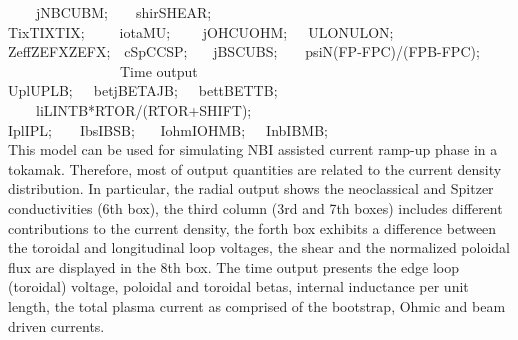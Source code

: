 {			~~~~jNB\bs CUBM;~~~~shir\bs SHEAR;
\\ \hspace*{1mm}
Tix\bs TIX\bs\bs TIX;~~~~~iota\bs MU;
			~~~~jOH\bs CUOHM;~~~ULON\bs ULON;
\\ \hspace*{1mm}
Zeff\bs ZEFX\bs\bs ZEFX;~~cSp\bs CCSP;
		~~~jBS\bs CUBS;~~~~psiN\bs (FP-FPC)/(FPB-FPC);
\smallskip\\ \hspace*{1mm}
~~~~~~~~~~~~~~~~Time output
\smallskip\\ \hspace*{1mm}
Upl\us UPLB;~~~betj\us BETAJB;~~~bett\us BETTB;
		~~~~li\us LINTB*RTOR/(RTOR+SHIFT);
\\ \hspace*{1mm}
Ipl\us IPL;~~~~Ibs\us IBSB;
		~~~Iohm\us IOHMB;~~~Inb\us IBMB\us 2;
\medskip\\}
This model can be used for simulating NBI assisted current ramp-up phase
in a tokamak.
Therefore, most of output quantities are related to the current density
distribution. 
In particular, the radial output shows the neoclassical and Spitzer
conductivities (6th box), the third column (3rd and 7th boxes) includes
different contributions to the current density, the forth box exhibits a 
difference between the toroidal and longitudinal loop voltages, the
shear and the normalized poloidal flux are displayed in the 8th box.
The time output presents the edge loop (toroidal) voltage, poloidal and
toroidal betas, internal inductance per unit length, the total plasma
current as comprised of the bootstrap, Ohmic and beam driven currents.

